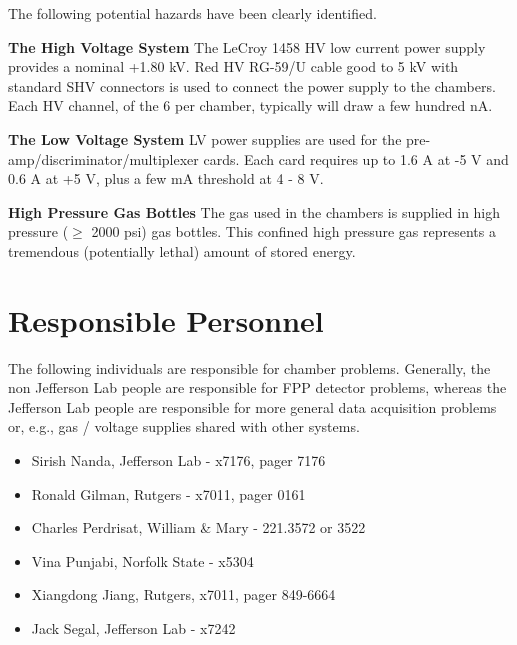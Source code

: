 \begin{safetyen}{10}{10}
The following potential hazards have been clearly identified.

\begin{description}

\item {\bf The High Voltage System}
The LeCroy 1458 HV low current power supply provides a nominal
+1.80 kV.
Red HV RG-59/U cable good to 5 kV with standard SHV connectors is used
to connect the power supply to the chambers.
Each HV channel, of the 6 per chamber, typically will draw a few hundred nA.

\item {\bf The Low Voltage System}
LV power supplies are used for the pre-amp/discriminator/multiplexer
cards.
Each card requires up to 
1.6 A at -5 V and 0.6 A at +5 V, plus a few mA threshold at 4 - 8 V.

\item{\bf High Pressure Gas Bottles} The  gas used 
in the chambers is supplied in high pressure ($\ge$ 2000 psi) gas
bottles. This confined high pressure gas represents a tremendous
(potentially lethal) amount of stored energy.
\end{description}
\end{safetyen}

\section{Responsible Personnel} 
The following individuals are responsible for chamber problems. 
Generally, the non Jefferson Lab people are responsible for
FPP detector problems, whereas the Jefferson Lab people are responsible
for more general data acquisition problems or, e.g., gas / voltage supplies
shared with other systems.
\begin{itemize}
\item[~]Sirish Nanda, Jefferson Lab - x7176, pager 7176
\item[~]Ronald Gilman, Rutgers - x7011, pager 0161
\item[~]Charles Perdrisat, William \& Mary  - 221.3572 or 3522
\item[~]Vina Punjabi, Norfolk State  - x5304
\item[~]Xiangdong Jiang, Rutgers, x7011, pager 849-6664
\item[~]Jack Segal, Jefferson Lab - x7242
\end{itemize}
 
%
%
%
%
%
%
